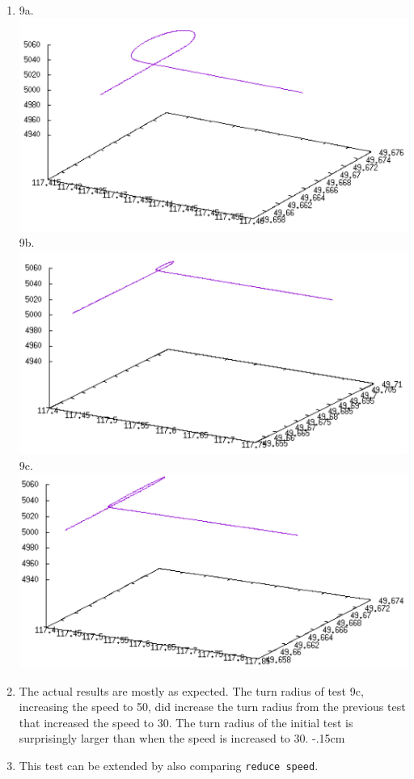 \documentclass[letterpaper, 12pt]{article}
\begin{document}
\begin{enumerate}
\item 9a. \includegraphics[scale=.35,valign=t]{test9_a.png} 9b.\includegraphics[scale=.35,valign=t]{test9_b.png}\\
9c. \includegraphics[scale=.35,valign=t]{test9_c.png}
\item The actual results are mostly as expected. The turn radius of test 9c, increasing the speed to 50, did increase the turn radius from the previous test that increased the speed to 30. The turn radius of the initial test is surprisingly larger than when the speed is increased to 30.
\itemsep-.15cm
\item This test can be extended by also comparing \verb!reduce speed!.
\end{enumerate}
\end{document}
